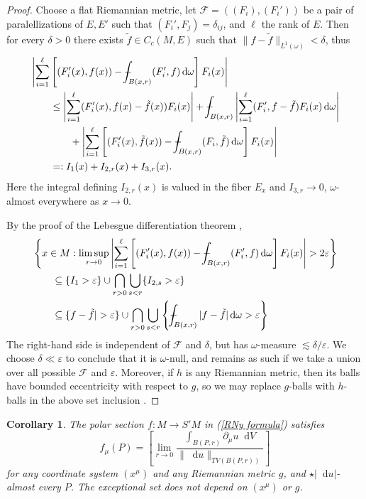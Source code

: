 \documentclass[reqno,11pt]{amsart}
\newcommand*\dif{\mathop{}\!\mathrm{d}}
\newtheorem{corollary}[theorem]{Corollary}
\theoremstyle{definition}
\numberwithin{equation}{section}
\def\Xint#1{\mathchoice
{\XXint\displaystyle\textstyle{#1}}%
{\XXint\textstyle\scriptstyle{#1}}%
{\XXint\scriptstyle\scriptscriptstyle{#1}}%
{\XXint\scriptscriptstyle\scriptscriptstyle{#1}}%
\!\int}
\def\XXint#1#2#3{{\setbox0=\hbox{$#1{#2#3}{\int}$ }
\vcenter{\hbox{$#2#3$ }}\kern-.6\wd0}}
\def\dashint{\Xint-}
\begin{document}
\begin{proof}
Choose a flat Riemannian metric, let $\mathcal F = ((F_i), (F_i'))$ be a pair of paralellizations of $E, E'$ such that $(F_i', F_j) = \delta_{ij}$, and $\ell$ the rank of $E$.
Then for every $\delta > 0$ there exists $\tilde f \in C_c(M, E)$ such that $\|f - \tilde f\|_{L^1(\omega)} < \delta$, thus
\begin{align*}
&\left|\sum_{i=1}^\ell \left[(F_i'(x), f(x)) - \dashint_{B(x, r)} (F_i', f) \dif \omega\right] F_i(x)\right| \\
&\qquad \leq \left|\sum_{i=1}^\ell (F_i'(x), f(x) - \tilde f(x)) F_i(x)\right| + \dashint_{B(x, r)} \left|\sum_{i=1}^\ell (F_i', f - \tilde f)F_i(x) \dif \omega \right| \\
&\qquad \qquad + \left|\sum_{i=1}^\ell \left[(F_i'(x), \tilde f(x)) - \dashint_{B(x, r)} (F_i, \tilde f) \dif \omega\right] F_i(x)\right| \\
&\qquad =: I_1(x) + I_{2, r}(x) + I_{3, r}(x).
\end{align*}
Here the integral defining $I_{2, r}(x)$ is valued in the fiber $E_x$ and $I_{3, r} \to 0$, $\omega$-almost everywhere as $x \to 0$.

By the proof of the Lebesgue differentiation theorem \cite[Chapter 3, Theorem 1.3]{stein2009real},
\begin{align*}
&\left\{x \in M: \limsup_{r \to 0} \left|\sum_{i=1}^\ell \left[(F_i'(x), f(x)) - \dashint_{B(x, r)} (F_i', f) \dif \omega\right] F_i(x)\right| > 2\varepsilon\right\} \\
&\qquad \subseteq \{I_1 > \varepsilon\} \cup \bigcap_{r > 0} \bigcup_{s <r} \{I_{2, s} > \varepsilon\} \\
&\qquad \subseteq \{f - \tilde f| > \varepsilon\} \cup \bigcap_{r > 0} \bigcup_{s < r} \left\{\dashint_{B(x, r)} |f - \tilde f| \dif \omega > \varepsilon\right\}
\end{align*}
The right-hand side is independent of $\mathcal F$ and $\delta$, but has $\omega$-measure $\lesssim \delta/\varepsilon$.
We choose $\delta \ll \varepsilon$ to conclude that it is $\omega$-null, and remains as such if we take a union over all possible $\mathcal F$ and $\varepsilon$.
Moreover, if $h$ is any Riemannian metric, then its balls have bounded eccentricity with respect to $g$, so we may replace $g$-balls with $h$-balls in the above set inclusion \cite[Chapter 3, Corollary 1.7]{stein2009real}.
\end{proof}

\begin{corollary}
The polar section $f: M \to S'M$ in (\ref{RNy formula}) satisfies
\begin{equation}\label{Lebesgue point definition}
    f_\mu(P) = \left[\lim_{r \to 0} \frac{\int_{B(P, r)} \partial_\mu u \dif V}{\|\dif u\|_{TV(B(P, r))}}\right]
\end{equation}
for any coordinate system $(x^\mu)$ and any Riemannian metric $g$, and $\star|\dif u|$-almost every $P$.
The exceptional set does not depend on $(x^\mu)$ or $g$.
\end{corollary}
\end{document}
